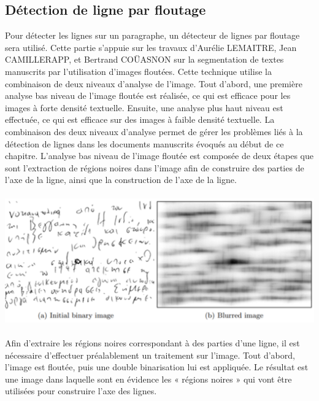 \subsection{Détection de ligne par floutage}

Pour détecter les lignes sur un paragraphe, un détecteur de lignes par floutage sera utilisé. Cette partie s'appuie sur les
travaux d'Aurélie LEMAITRE, Jean CAMILLERAPP, et Bertrand COÜASNON\cite{blur:2014} sur la segmentation de textes manuscrits par l’utilisation
d’images floutées. Cette technique utilise la combinaison de deux niveaux d'analyse de l'image. Tout d'abord, une première
analyse bas niveau de l'image floutée est réalisée, ce qui est efficace pour les images à forte densité textuelle. Ensuite,
une analyse plus haut niveau est effectuée, ce qui est efficace sur des images à faible densité textuelle. La combinaison des
deux niveaux d'analyse permet de gérer les problèmes liés à la détection de lignes dans les documents manuscrits évoqués au
début de ce chapitre. L'analyse bas niveau de l'image floutée est composée de deux étapes que sont l'extraction de régions
noires dans l'image afin de construire des parties de l'axe de la ligne, ainsi que la construction de l'axe de la ligne.

\paragraph{}
\begin{mdframed}[frametitle={Figure 11 : Floutage d'une image}, innerbottommargin=10]
\begin{center}
\includegraphics[width=0.6\linewidth]{detect1.png}
\end{center}
\end{mdframed}

\paragraph{}
Afin d'extraire les régions noires correspondant à des parties d'une ligne, il est nécessaire d'effectuer préalablement un
traitement sur l'image. Tout d'abord, l'image est floutée, puis une double binarisation lui est appliquée. Le résultat est
une image dans laquelle sont en évidence les « régions noires » qui vont être utilisées pour construire l'axe des lignes.

